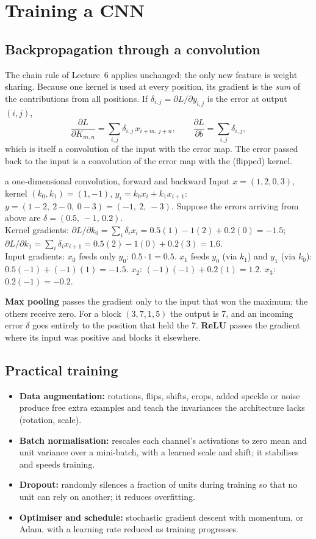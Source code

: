 \documentclass[11pt]{article}
\begin{document}
\section{Training a CNN}
\subsection{Backpropagation through a convolution}
The chain rule of Lecture~6 applies unchanged; the only new feature is weight sharing. Because one kernel is used at every position, its gradient is the \emph{sum} of the contributions from all positions. If $\delta_{i,j}=\partial L/\partial y_{i,j}$ is the error at output $(i,j)$,
\[\frac{\partial L}{\partial K_{m,n}}=\sum_{i,j}\delta_{i,j}\,x_{i+m,\,j+n},\qquad\frac{\partial L}{\partial b}=\sum_{i,j}\delta_{i,j},\]
which is itself a convolution of the input with the error map. The error passed back to the input is a convolution of the error map with the (flipped) kernel.
\begin{example}{a one-dimensional convolution, forward and backward}
Input $x=(1,2,0,3)$, kernel $(k_0,k_1)=(1,-1)$, $y_i=k_0x_i+k_1x_{i+1}$: $y=(1-2,\ 2-0,\ 0-3)=(-1,\ 2,\ -3)$. Suppose the errors arriving from above are $\delta=(0.5,\,-1,\,0.2)$.\\
Kernel gradients: $\partial L/\partial k_0=\sum_i\delta_ix_i=0.5(1)-1(2)+0.2(0)=-1.5$; $\partial L/\partial k_1=\sum_i\delta_ix_{i+1}=0.5(2)-1(0)+0.2(3)=1.6$.\\
Input gradients: $x_0$ feeds only $y_0$: $0.5\cdot1=0.5$. $x_1$ feeds $y_0$ (via $k_1$) and $y_1$ (via $k_0$): $0.5(-1)+(-1)(1)=-1.5$. $x_2$: $(-1)(-1)+0.2(1)=1.2$. $x_3$: $0.2(-1)=-0.2$.
\end{example}
\textbf{Max pooling} passes the gradient only to the input that won the maximum; the others receive zero. For a block $(3,7,1,5)$ the output is 7, and an incoming error $\delta$ goes entirely to the position that held the 7. \textbf{ReLU} passes the gradient where its input was positive and blocks it elsewhere.

\subsection{Practical training}
\begin{itemize}
\item \textbf{Data augmentation:} rotations, flips, shifts, crops, added speckle or noise produce free extra examples and teach the invariances the architecture lacks (rotation, scale).
\item \textbf{Batch normalisation:} rescales each channel's activations to zero mean and unit variance over a mini-batch, with a learned scale and shift; it stabilises and speeds training.
\item \textbf{Dropout:} randomly silences a fraction of units during training so that no unit can rely on another; it reduces overfitting.
\item \textbf{Optimiser and schedule:} stochastic gradient descent with momentum, or Adam, with a learning rate reduced as training progresses.
\end{itemize}
\end{document}

